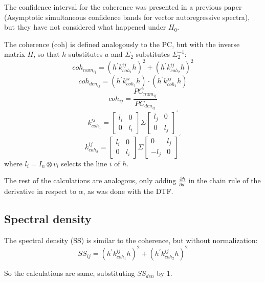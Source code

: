 \documentclass[a4paper,10pt]{article}
\begin{document}
The confidence interval for the coherence was presented in a previous paper (Asymptotic simultaneous confidence bands for vector autoregressive spectra), but they have not considered what happened under $H_0$.

The coherence (coh) is defined analogously to the PC, but with the inverse matrix $H$, so that $h$ substitutes $a$ and $\Sigma_{2}$ substitutes $\Sigma_{2}^{-1}$:
\begin{equation}
coh_{num_{ij}} = \left( h^{'} k_{coh_{1}}^{ij} h \right)^{2} + \left( h^{'} k_{coh_{2}}^{ij} h \right)^{2}
\end{equation}
\begin{equation}
coh_{den_{ij}} = \left( h^{'} k_{coh_{1}}^{ii} h \right) \cdot \left( h^{'} k_{coh_{1}}^{jj} h \right)
\end{equation}
\begin{equation}
coh_{ij} = \frac{PC_{num_{ij}}}{PC_{den_{ij}}}
\end{equation}
\begin{equation}
k_{coh_{1}}^{ij} = \left[ \begin{array}{cc}
 l_{i} & 0 \\ 0 & l_{i}
\end{array} \right] \Sigma \left[ \begin{array}{cc}
 l_{j} & 0 \\ 0 & l_{j}
\end{array} \right]^{'}
\end{equation}
\begin{equation}
k_{coh_{2}}^{ij} = \left[ \begin{array}{cc}
 l_{i} & 0 \\ 0 & l_{i}
\end{array} \right] \Sigma \left[ \begin{array}{cc}
 0 & l_{j} \\ -l_{j} & 0
\end{array} \right]^{'}
\end{equation}
where $l_{i} = I_{n} \otimes v_{i}$ selects the line $i$ of $h$.

The rest of the calculations are analogous, only adding $\frac{\partial h}{\partial a^{'}}$ in the chain rule of the derivative in respect to $\alpha$, as was done with the DTF.

\subsection{Spectral density}

The spectral density (SS) is similar to the coherence, but without normalization:
\begin{equation}
SS_{ij} = \left( h^{'} k_{coh_{1}}^{ij} h \right)^{2} + \left( h^{'} k_{coh_2}^{ij} h \right)^{2}
\end{equation}

So the calculations are same, substituting $SS_{den}$ by 1.
\end{document}
